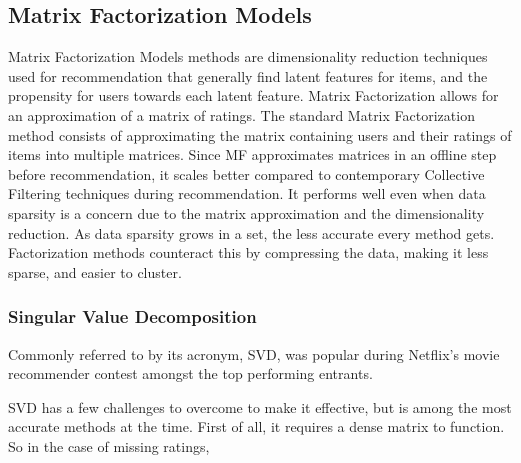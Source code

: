 \subsection{Matrix Factorization Models} \label{bg:sub:factorizationmodels}
Matrix Factorization Models methods are dimensionality reduction techniques used for recommendation that generally find latent features for items, and the propensity for users towards each latent feature.
Matrix Factorization allows for an approximation of a matrix of ratings. The standard Matrix Factorization method consists of approximating the matrix containing users and their ratings of items into multiple matrices.
Since MF approximates matrices in an offline step before recommendation, it scales better compared to contemporary Collective Filtering techniques during recommendation. It performs well even when data sparsity is a concern due to the matrix approximation and the dimensionality reduction.
As data sparsity grows in a set, the less accurate every method gets. Factorization methods counteract this by compressing the data, making it less sparse, and easier to cluster.


\subsubsection{Singular Value Decomposition}
Commonly referred to by its acronym, SVD, was popular during Netflix's movie recommender contest amongst the top performing entrants.



SVD has a few challenges to overcome to make it effective, but is among the most accurate methods at the time. First of all, it requires a dense matrix to function. So in the case of missing ratings, 

